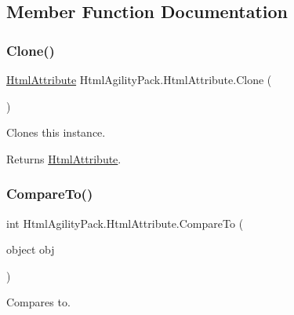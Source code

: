 \subsection{Member Function Documentation}
\mbox{\label{class_html_agility_pack_1_1_html_attribute_a45f91960f8aa5f800790435a012fab94}} 
\subsubsection{\texorpdfstring{Clone()}{Clone()}}
{\footnotesize\ttfamily \hyperlink{class_html_agility_pack_1_1_html_attribute}{Html\+Attribute} Html\+Agility\+Pack.\+Html\+Attribute.\+Clone (\begin{DoxyParamCaption}{ }\end{DoxyParamCaption})\hspace{0.3cm}{\ttfamily [inline]}}



Clones this instance. 

\begin{DoxyReturn}{Returns}
\hyperlink{class_html_agility_pack_1_1_html_attribute}{Html\+Attribute}.
\end{DoxyReturn}
\mbox{\label{class_html_agility_pack_1_1_html_attribute_ab3be22f2a16485e0cb8c811d06dc2e0f}} 
\subsubsection{\texorpdfstring{Compare\+To()}{CompareTo()}}
{\footnotesize\ttfamily int Html\+Agility\+Pack.\+Html\+Attribute.\+Compare\+To (\begin{DoxyParamCaption}\item[{object}]{obj }\end{DoxyParamCaption})\hspace{0.3cm}{\ttfamily [inline]}}



Compares to. 


